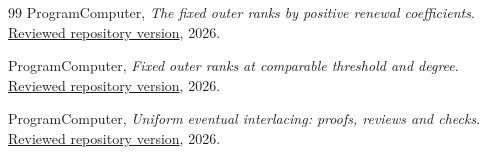 \documentclass[11pt]{article}
\begin{document}
\begin{thebibliography}{99}
 ProgramComputer, \emph{The fixed outer ranks by positive renewal coefficients}. \href{https://github.com/ProgramComputer/open-math-research/blob/8624d14aef697bf2b515881bdda873228c0b5b50/topics/ordered-large-blocks/outer-ranks/renewal.md}{Reviewed repository version}, 2026.

 ProgramComputer, \emph{Fixed outer ranks at comparable threshold and degree}. \href{https://github.com/ProgramComputer/open-math-research/blob/8624d14aef697bf2b515881bdda873228c0b5b50/topics/ordered-large-blocks/outer-ranks/comparable.md}{Reviewed repository version}, 2026.

 ProgramComputer, \emph{Uniform eventual interlacing: proofs, reviews and checks}. \href{https://github.com/ProgramComputer/open-math-research/blob/8624d14aef697bf2b515881bdda873228c0b5b50/topics/ordered-large-blocks/uniform-eventual/verification.md}{Reviewed repository version}, 2026.

\end{thebibliography}
\endgroup
\end{document}
